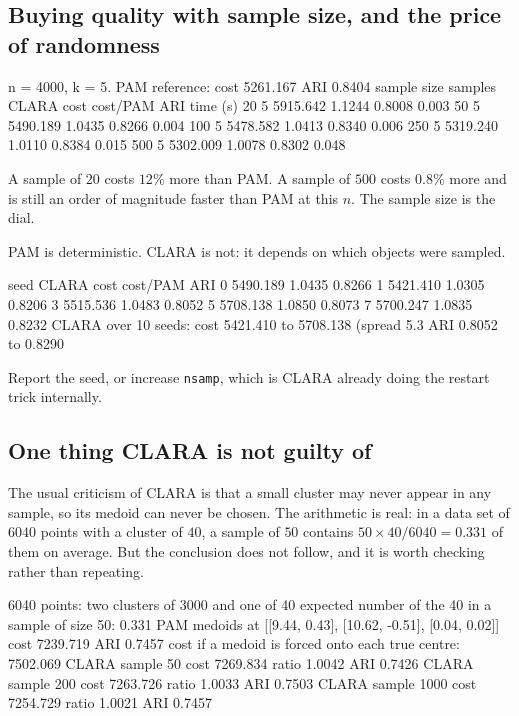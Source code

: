\documentclass[11pt]{article}
\begin{document}
\subsection{Buying quality with sample size, and the price of randomness}

\begin{codeout}
  n = 4000, k = 5.  PAM reference: cost 5261.167   ARI 0.8404
  sample size   samples   CLARA cost   cost/PAM     ARI    time (s)
           20         5     5915.642     1.1244  0.8008     0.003
           50         5     5490.189     1.0435  0.8266     0.004
          100         5     5478.582     1.0413  0.8340     0.006
          250         5     5319.240     1.0110  0.8384     0.015
          500         5     5302.009     1.0078  0.8302     0.048
\end{codeout}

A sample of $20$ costs $12\%$ more than PAM. A sample of $500$ costs $0.8\%$
more and is still an order of magnitude faster than PAM at this $n$. The
sample size is the dial.

\begin{caution}
PAM is deterministic. CLARA is not: it depends on which objects were sampled.
\begin{codeout}
  seed   CLARA cost   cost/PAM     ARI
     0     5490.189     1.0435  0.8266
     1     5421.410     1.0305  0.8206
     3     5515.536     1.0483  0.8052
     5     5708.138     1.0850  0.8073
     7     5700.247     1.0835  0.8232
  CLARA over 10 seeds: cost 5421.410 to 5708.138 (spread 5.3%
                       ARI 0.8052 to 0.8290
\end{codeout}
Report the seed, or increase \texttt{nsamp}, which is CLARA already doing the
restart trick internally.
\end{caution}

\subsection{One thing CLARA is not guilty of}

The usual criticism of CLARA is that a small cluster may never appear in any
sample, so its medoid can never be chosen. The arithmetic is real: in a data
set of $6040$ points with a cluster of $40$, a sample of $50$ contains
$50 \times 40/6040 = 0.331$ of them on average. But the conclusion does not
follow, and it is worth checking rather than repeating.

\begin{codeout}
  6040 points: two clusters of 3000 and one of 40
  expected number of the 40 in a sample of size 50: 0.331
  PAM   medoids at [[9.44, 0.43], [10.62, -0.51], [0.04, 0.02]]
        cost 7239.719   ARI 0.7457
  cost if a medoid is forced onto each true centre: 7502.069
  CLARA sample   50  cost 7269.834  ratio 1.0042  ARI 0.7426
  CLARA sample  200  cost 7263.726  ratio 1.0033  ARI 0.7503
  CLARA sample 1000  cost 7254.729  ratio 1.0021  ARI 0.7457
\end{codeout}
\end{document}
